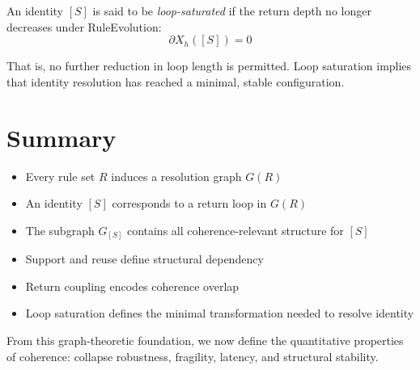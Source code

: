 \begin{definition} \label{def:loop-saturation}
An identity $[S]$ is said to be \textit{loop-saturated} if the return depth no longer decreases under RuleEvolution:
\begin{equation} \label{eq:loop-saturation}
\partial X_h([S]) = 0
\end{equation}
\end{definition}

That is, no further reduction in loop length is permitted.  
Loop saturation implies that identity resolution has reached a minimal, stable configuration.

\section{Summary}

\begin{itemize}
  \item Every rule set $R$ induces a resolution graph $G(R)$
  \item An identity $[S]$ corresponds to a return loop in $G(R)$
  \item The subgraph $G_{[S]}$ contains all coherence-relevant structure for $[S]$
  \item Support and reuse define structural dependency
  \item Return coupling encodes coherence overlap
  \item Loop saturation defines the minimal transformation needed to resolve identity
\end{itemize}

From this graph-theoretic foundation, we now define the quantitative properties of coherence: collapse robustness, fragility, latency, and structural stability.
